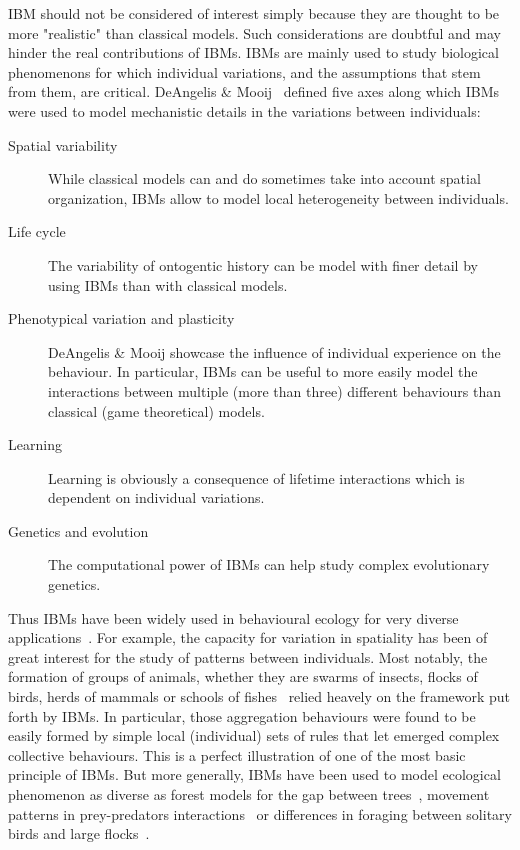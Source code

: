     IBM should not be considered of interest simply because they are thought to be more "realistic" than classical models. Such considerations are doubtful and may hinder the real contributions of IBMs. IBMs are mainly used to study biological phenomenons for which individual variations, and the assumptions that stem from them, are critical. DeAngelis & Mooij~\cite{DeAngelis2005} defined five axes along which IBMs were used to model mechanistic details in the variations between individuals:

    \begin{description}
        \item[Spatial variability] {While classical models can and do sometimes take into account spatial organization, IBMs allow to model local heterogeneity between individuals.}
        \item[Life cycle] {The variability of ontogentic history can be model with finer detail by using IBMs than with classical models.}
        \item[Phenotypical variation and plasticity] {DeAngelis & Mooij showcase the influence of individual experience on the behaviour. In particular, IBMs can be useful to more easily model the interactions between multiple (more than three) different behaviours than classical (game theoretical) models.}
        \item[Learning] {Learning is obviously a consequence of lifetime interactions which is dependent on individual variations.}
        \item[Genetics and evolution] {The computational power of IBMs can help study complex evolutionary genetics.}
    \end{description}

    Thus IBMs have been widely used in behavioural ecology for very diverse applications~\cite{DeAngelis2005}. For example, the capacity for variation in spatiality has been of great interest for the study of patterns between individuals. Most notably, the formation of groups of animals, whether they are swarms of insects, flocks of birds, herds of mammals or schools of fishes~\cite{Hurt1992, Gueron1996, Couzin2002} relied heavely on the framework put forth by IBMs. In particular, those aggregation behaviours were found to be easily formed by simple local (individual) sets of rules that let emerged complex collective behaviours. This is a perfect illustration of one of the most basic principle of IBMs. But more generally, IBMs have been used to model ecological phenomenon as diverse as forest models for the gap between trees~\cite{Botkin1972}, movement patterns in prey-predators interactions~\cite{Smith1991} or differences in foraging between solitary birds and large flocks~\cite{Toquenaga1995}.

